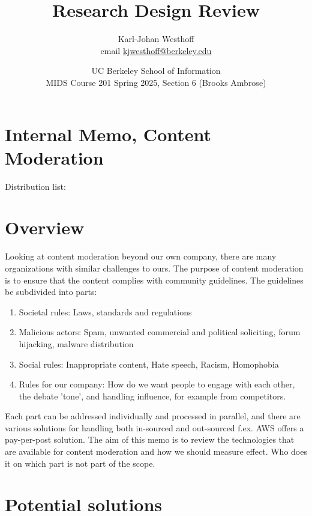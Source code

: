 \documentclass[
	letterpaper, %
	12pt, %
	unnumberedsections, %
	twoside, %
]{LTJournalArticle}
\title{Research Design Review} %
\author{
	Karl-Johan Westhoff \\
	email \href{mailto:kjwesthoff@berkeley.edu}{kjwesthoff@berkeley.edu}
}
\date{UC Berkeley School of Information \\
MIDS Course 201 Spring 2025, Section 6 (Brooks Ambrose)
}
\begin{document}
\onecolumn
\maketitle %





\section*{Internal Memo, Content Moderation}
Distribution list:





\section*{Overview}
Looking at content moderation beyond our own company, there are many organizations with similar challenges to ours. The purpose of content moderation is to ensure that the content complies with community guidelines. The guidelines be subdivided into parts:

\begin{enumerate}[label=(\Alph*)]
	\item Societal rules: Laws, standards and regulations
	\item Malicious actors: Spam, unwanted commercial and political soliciting, forum hijacking, malware distribution
	\item Social rules: Inappropriate content, Hate speech, Racism, Homophobia
	\item Rules for our company: How do we want people to engage with each other, the debate 'tone', and handling influence, for example from competitors.
\end{enumerate}

Each part can be addressed individually and processed in parallel, and there are various solutions for handling both in-sourced and out-sourced f.ex. AWS\cite{AWS_contentModeration} offers a pay-per-post solution. The aim of this memo is to review the technologies that are available for content moderation and how we should measure effect. Who does it on which part is not part of the scope.


\section{Potential solutions}
\end{document}

